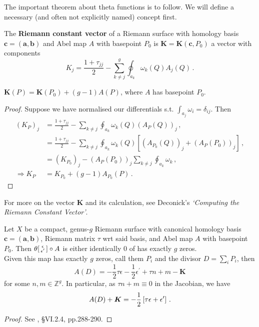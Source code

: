 \documentclass{article}
\begin{document}
The important theorem about theta functions is to follow. We will define a necessary (and often not explicitly named) concept first.

\begin{definition}
	The \textbf{Riemann constant vector} of a Riemann surface with homology basis $\bm{c} = (\bm{a},\bm{b})$ and Abel map $A$ with basepoint $P_0$ is  $\bm{K}=\bm{K}(\bm{c},P_0)$ a vector with components
	\[
	K_j = \frac{1+\tau_{jj}}{2} - \sum_{k \neq j}^g \oint_{a_k} \omega_k(Q) A_j(Q) \, .
	\]
\end{definition}

\begin{prop}
	$\bm{K}(P) = \bm{K}(P_0) + (g-1) A(P)$, where $A$ has basepoint $P_0$. 
\end{prop}
\begin{proof}
	Suppose we have normalised our differentials s.t. $\int_{a_j} \omega_i = \delta_{ij}$. Then 
	\begin{align*}
	(K_{P})_j &= \frac{1+\tau_{jj}}{2} - \sum_{k \neq j} \oint_{a_k} \omega_k(Q) (A_P(Q))_j \, , \\
	&= \frac{1+\tau_{jj}}{2} - \sum_{k \neq j} \oint_{a_k} \omega_k(Q) [(A_{P_0}(Q))_j + (A_{P}(P_0))_j] \, , \\
	&= (K_{P_0})_j -(A_{P}(P_0))_j \sum_{k \neq j} \oint_{a_k} \omega_k \, , \\
\Rightarrow K_P &= K_{P_0} + (g-1) A_{P_0}(P) \, . 
	\end{align*}
\end{proof}

\begin{remark}
	For more on the vector $\bm{K}$ and its calculation, see Deconick's \textit{`Computing the Riemann Constant Vector'}. 
\end{remark}

\begin{theorem}\label{thm: zeros of the theta function in terms of characteristics}
	Let $X$ be a compact, genus-$g$ Riemann surface with canonical homology basis $\bm{c} = (\bm{a},\bm{b})$, Riemann matrix $\tau$ wrt said basis, and Abel map $A$ with basepoint $P_0$. Then $\theta\begin{bsmallmatrix} \epsilon \\ \epsilon^\prime \end{bsmallmatrix} \circ A$ is either identically $0$ of has exactly $g$ zeros.  \\
	Given this map has exactly $g$ zeros, call them $P_i$ and the divisor $D = \sum_i P_i$, then 
	\[
	A(D) = -\frac{1}{2}\tau \epsilon - \frac{1}{2}\epsilon^\prime + \tau n + m - \bm{K} 
	\]
	for some $n,m \in \mathbb{Z}^g$. In particular, as $\tau n +m \equiv 0$ in the Jacobian, we have 
	\[
	A(D)+\bm{K} = -\frac{1}{2}\left[ \tau \epsilon + \epsilon^\prime \right] \, .
	\]
\end{theorem}
\begin{proof}
	See \cite{Farkas1992}, \S VI.2.4, pp.288-290. 
\end{proof}
\end{document}
